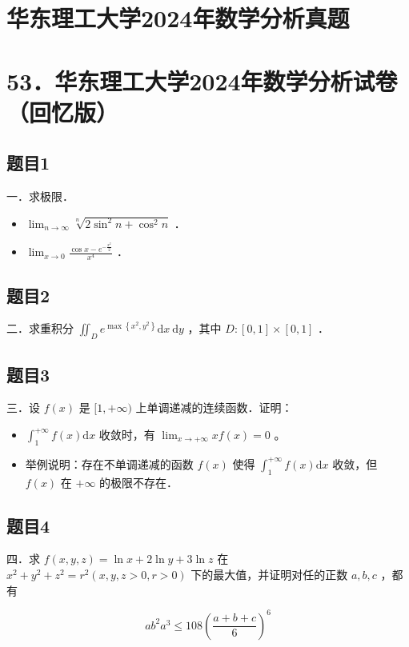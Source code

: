 \documentclass{article}
\begin{document}
\section*{华东理工大学2024年数学分析真题}
\section*{53．华东理工大学2024年数学分析试卷（回忆版）}

\subsection{题目1}
一．求极限．

\begin{itemize}
  \item[（1）] \(\lim _{n \rightarrow \infty} \sqrt[n]{2 \sin ^{2} n+\cos ^{2} n}\) ．
  \item[（2）] \(\lim _{x \rightarrow 0} \frac{\cos x-e^{-\frac{x^{2}}{2}}}{x^{4}}\) ．
\end{itemize}

\subsection{题目2}
二．求重积分 \(\iint_{D} e^{\max \left\{x^{2}, y^{2}\right\}} \mathrm{d} x \mathrm{~d} y\) ，其中 \(D:[0,1] \times[0,1]\) ．

\subsection{题目3}
三．设 \(f(x)\) 是 \([1,+\infty)\) 上单调递减的连续函数．证明：

\begin{itemize}
  \item[（1）] \(\int_{1}^{+\infty} f(x) \mathrm{d} x\) 收敛时，有 \(\lim _{x \rightarrow+\infty} x f(x)=0\) 。
  \item[（2）] 举例说明：存在不单调递减的函数 \(f(x)\) 使得 \(\int_{1}^{+\infty} f(x) \mathrm{d} x\) 收敛，但 \(f(x)\) 在 \(+\infty\) 的极限不存在．
\end{itemize}

\subsection{题目4}
四．求 \(f(x, y, z)=\ln x+2 \ln y+3 \ln z\) 在 \(x^{2}+y^{2}+z^{2}=r^{2}(x, y, z>0, r>0)\) 下的最大值，并证明对任的正数 \(a, b, c\) ，都有

\[
a b^{2} a^{3} \leq 108\left(\frac{a+b+c}{6}\right)^{6}
\]
\end{document}
